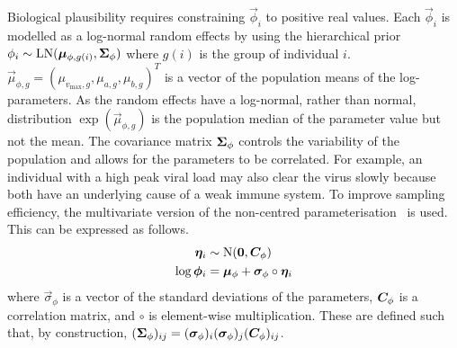 \documentclass[thesis.tex]{subfiles}
\begin{document}
Biological plausibility requires constraining $\vec{\phi}_i$ to positive real values.
Each $\vec{\phi}_i$ is modelled as a log-normal random effects by using the hierarchical prior $\phi_i \sim \operatorname{LN}(\bm{\mu}_{\phi,g(i)}, \bm{\Sigma}_\phi)$ where $g(i)$ is the group of individual $i$.
$\vec{\mu}_{\phi,g} = (\mu_{v_{\max},g}, \mu_{a,g}, \mu_{b,g})^T$ is a vector of the population means of the log-parameters.
As the random effects have a log-normal, rather than normal, distribution $\exp(\vec{\mu}_{\phi,g})$ is the population median of the parameter value but not the mean.
The covariance matrix $\bm{\Sigma}_\phi$ controls the variability of the population and allows for the parameters to be correlated.
For example, an individual with a high peak viral load may also clear the virus slowly because both have an underlying cause of a weak immune system.
To improve sampling efficiency, the multivariate version of the non-centred parameterisation~\autocite{papaspiliopoulosGeneral,stanReparameterization} is used.
This can be expressed as follows.
\begin{align}
  \bm{\eta}_i &\sim \operatorname{N}(\bm{0}, \bm{C}_\phi) \\
  \log \bm{\phi}_i &= \bm{\mu}_\phi + \bm{\sigma}_\phi \circ \bm{\eta}_i
\end{align}
where $\vec{\sigma}_\phi$ is a vector of the standard deviations of the parameters, $\bm{C}_\phi$ is a correlation matrix, and $\circ$ is element-wise multiplication.
These are defined such that, by construction, $(\bm{\Sigma}_\phi)_{ij} = (\bm{\sigma}_\phi)_i (\bm{\sigma}_\phi)_j (\bm{C}_\phi)_{ij}$.
\end{document}
